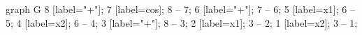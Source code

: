 graph G {
8 [label="+"];
7 [label=cos];
8 -- 7;
6 [label="+"];
7 -- 6;
5 [label=x1];
6 -- 5;
4 [label=x2];
6 -- 4;
3 [label="+"];
8 -- 3;
2 [label=x1];
3 -- 2;
1 [label=x2];
3 -- 1;
}
